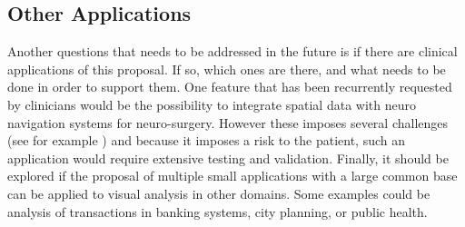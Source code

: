 \subsection{Other Applications}

Another questions that needs to be addressed in the future is if there are clinical applications of this proposal. If so, which ones are there, and what needs to be done in order to support them. One feature that has been recurrently requested by clinicians would be the possibility to integrate spatial data with neuro navigation systems for neuro-surgery. However these imposes several challenges (see for example \autocite{talos_diffusion_2003}) and because it imposes a  risk to the patient, such an application would require extensive testing and validation.
Finally, it should be explored if the proposal of multiple small applications with a large common base can be applied to visual analysis in other domains. Some examples could be analysis of transactions in banking systems, city planning, or public health.  